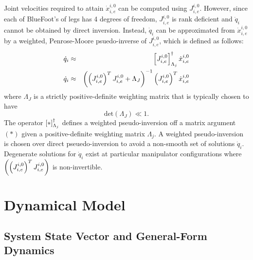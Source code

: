 			Joint velocities required to attain $\dot{x}^{i,0}_{i,e}$ can be computed using $J^{i,0}_{i,e}$. However, since each of BlueFoot's of legs has 4 degrees of freedom, $J^{i,0}_{i,e}$ is rank deficient and $\dot{q}_{i}$ cannot be obtained by direct inversion. Instead, $\dot{q}_{i}$ can be approximated from $\dot{x}^{i,0}_{i,e}$ by a weighted, Penrose-Moore psuedo-inverse of $J^{i,0}_{i,e}$, which is defined as follows:
				\begin{eqnarray}
					\dot{q}_{i} &\approx& \left[J^{i,0}_{i,e}\right]_{\Lambda_{j}}^{\dagger} \dot{x}^{i,0}_{i,e} \nonumber \\
					\dot{q}_{i} &\approx& \left( \left(J^{i,0}_{i,e}\right)^{T}J^{i,0}_{i,e} + \Lambda_{J} \right)^{-1} \left(J^{i,0}_{i,e}\right)^{T}\dot{x}^{i,0}_{i,e}
				\end{eqnarray}
			where $\Lambda_{J}$ is a strictly positive-definite weighting matrix that is typically chosen to have 
				\begin{equation*}
					\text{det}(\Lambda_{J}) \ll 1.
				\end{equation*}
			The operator $\left[*\right]_{\Lambda_{j}}^{\dagger}$ defines a weighted pseudo-inversion off a matrix argument $(*)$ given a positive-definite weighting matrix $\Lambda_{j}$. A weighted pseudo-inversion is chosen over direct pseuedo-inversion to avoid a non-smooth set of solutions $\dot{q}_{i}$. Degenerate solutions for $\dot{q}_{i}$ exist at particular manipulator configurations where $\left(\left(J^{i,0}_{i,e}\right)^{T}J^{i,0}_{i,e}\right)$ is non-invertible.




	\section{Dynamical Model}
	

		\subsection{System State Vector and General-Form Dynamics}
		
